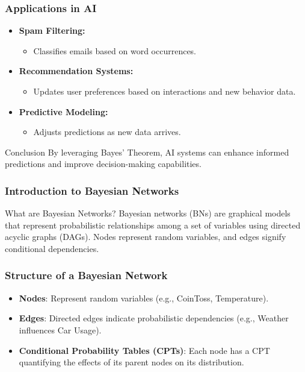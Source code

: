 \documentclass[aspectratio=169]{beamer}
\begin{document}
\begin{frame}[fragile]
    \frametitle{Applications in AI}
    \begin{itemize}
        \item \textbf{Spam Filtering:} 
            \begin{itemize}
                \item Classifies emails based on word occurrences.
            \end{itemize}
        \item \textbf{Recommendation Systems:} 
            \begin{itemize}
                \item Updates user preferences based on interactions and new behavior data.
            \end{itemize}
        \item \textbf{Predictive Modeling:} 
            \begin{itemize}
                \item Adjusts predictions as new data arrives.
            \end{itemize}
    \end{itemize}
    \begin{block}{Conclusion}
        By leveraging Bayes' Theorem, AI systems can enhance informed predictions and improve decision-making capabilities.
    \end{block}
\end{frame}

\begin{frame}[fragile]
    \frametitle{Introduction to Bayesian Networks}
    \begin{block}{What are Bayesian Networks?}
        Bayesian networks (BNs) are graphical models that represent probabilistic relationships among a set of variables using directed acyclic graphs (DAGs). Nodes represent random variables, and edges signify conditional dependencies.
    \end{block}
\end{frame}

\begin{frame}[fragile]
    \frametitle{Structure of a Bayesian Network}
    \begin{itemize}
        \item \textbf{Nodes}: Represent random variables (e.g., CoinToss, Temperature).
        \item \textbf{Edges}: Directed edges indicate probabilistic dependencies (e.g., Weather influences Car Usage).
        \item \textbf{Conditional Probability Tables (CPTs)}: Each node has a CPT quantifying the effects of its parent nodes on its distribution.
    \end{itemize}
\end{frame}
\end{document}
